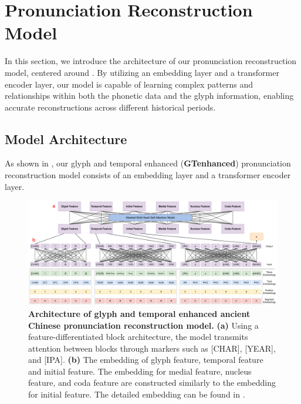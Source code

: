 \section{Pronunciation Reconstruction Model} \label{sec:model}
In this section, we introduce the architecture of our pronunciation reconstruction model, centered around . By utilizing an embedding layer and a transformer encoder layer, our model is capable of learning complex patterns and relationships within both the phonetic data and the glyph information, enabling accurate reconstructions across different historical periods.

\subsection{Model Architecture}
As shown in , our glyph and temporal enhanced (\textbf{GTenhanced}) pronunciation reconstruction model consists of an embedding layer and a transformer encoder layer.

\begin{figure}
    \centering
    \includegraphics[width=1\textwidth]{images/embedding.png}
    \caption{\textbf{Architecture of glyph and temporal enhanced ancient Chinese pronunciation reconstruction model.} \textbf{(a)} Using a feature-differentiated block architecture, the model transmits attention between blocks through markers such as [CHAR], [YEAR], and [IPA]. \textbf{(b)} The embedding of glyph feature, temporal feature and initial feature. The embedding for medial feature, nucleus feature, and coda feature are constructed similarly to the embedding for initial feature. The detailed embedding can be found in .}
    \label{fig:model_structure}
\end{figure}

